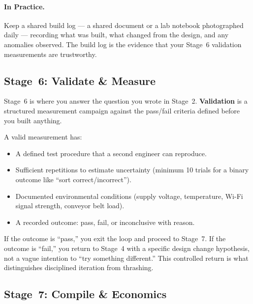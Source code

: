 \paragraph{In Practice.}
Keep a shared build log --- a shared document or a lab notebook photographed
daily --- recording what was built, what changed from the design, and any
anomalies observed.
The build log is the evidence that your Stage~6 validation measurements are
trustworthy.

\subsection{Stage~6: Validate \& Measure}
\label{sec:ch3-stage6}

Stage~6 is where you answer the question you wrote in Stage~2.
\textbf{Validation} is a structured measurement campaign
against the pass/fail criteria defined before you built anything.

A valid measurement has:
\begin{itemize}
  \item A defined test procedure that a second engineer can reproduce.
  \item Sufficient repetitions to estimate uncertainty
        (minimum 10 trials for a binary outcome like ``sort correct/incorrect'').
  \item Documented environmental conditions (supply voltage, temperature,
        Wi-Fi signal strength, conveyor belt load).
  \item A recorded outcome: pass, fail, or inconclusive with reason.
\end{itemize}

If the outcome is ``pass,'' you exit the loop and proceed to Stage~7.
If the outcome is ``fail,'' you return to Stage~4 with a specific design
change hypothesis, not a vague intention to ``try something different.''
This controlled return is what distinguishes disciplined iteration from
thrashing.

\subsection{Stage~7: Compile \& Economics}
\label{sec:ch3-stage7}

